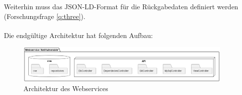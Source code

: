     Weiterhin muss das \ac{JSON-LD}-Format für die Rückgabedaten definiert werden (Forschungsfrage \ref{q:three}).
    \\ \\ 
    \noindent Die endgültige Architektur hat folgenden Aufbau:
    \begin{figure}[H]
        \centering
        \includegraphics[width=0.95\textwidth]{5_concept/architecture.png}
        \caption{Architektur des Webservices}
        \label{png:ArchitekturDesWebservices}
    \end{figure}
